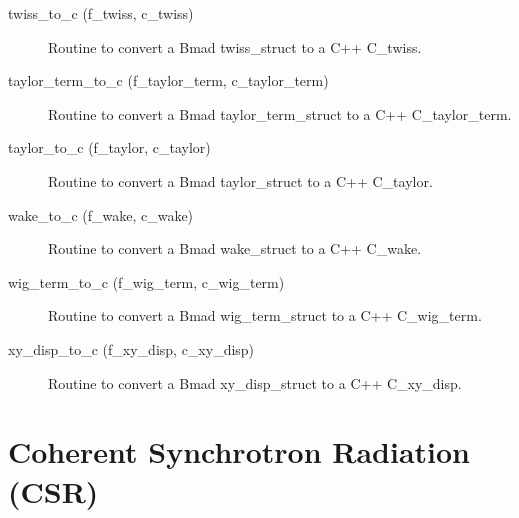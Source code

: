 \begin{description}
\label{r:twiss.to.c}
\item[twiss_to_c (f_twiss, c_twiss)] \Newline 
Routine to convert a Bmad twiss_struct to a C++ C_twiss.

\label{r:taylor.term.to.c}
\item[taylor_term_to_c (f_taylor_term, c_taylor_term)] \Newline 
Routine to convert a Bmad taylor_term_struct to a C++ C_taylor_term.

\label{r:taylor.to.c}
\item[taylor_to_c (f_taylor, c_taylor)] \Newline 
Routine to convert a Bmad taylor_struct to a C++ C_taylor.

\label{r:wake.to.c}
\item[wake_to_c (f_wake, c_wake)] \Newline 
Routine to convert a Bmad wake_struct to a C++ C_wake.

\label{r:wig.term.to.c}
\item[wig_term_to_c (f_wig_term, c_wig_term)] \Newline 
Routine to convert a Bmad wig_term_struct to a C++ C_wig_term.

\label{r:xy.disp.to.c}
\item[xy_disp_to_c (f_xy_disp, c_xy_disp)] \Newline
Routine to convert a Bmad xy_disp_struct to a C++ C_xy_disp.

\end{description}

\section{Coherent Synchrotron Radiation (CSR)}
\label{r:csr}


